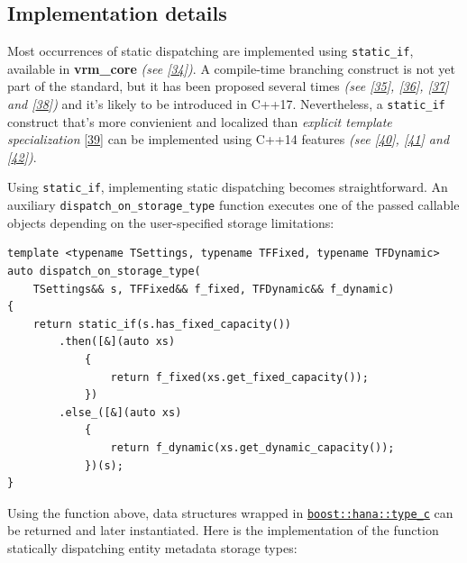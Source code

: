 \documentclass[oneside, 12pt, a4paper, openany]{book}
\begin{document}
\subsection{Implementation details}\label{implementation-details-5}

Most occurrences of static dispatching are implemented using
\texttt{static_if},
available in \textbf{vrm\_core} \emph{(see
{[}\protect\hyperlink{ref-github_vrmcore}{34}{]})}. A compile-time
branching construct is not yet part of the standard, but it has been
proposed several times \emph{(see
{[}\protect\hyperlink{ref-isocpp_sif0}{35}{]},
{[}\protect\hyperlink{ref-isocpp_sif1}{36}{]},
{[}\protect\hyperlink{ref-isocpp_sif2}{37}{]} and
{[}\protect\hyperlink{ref-isocpp_sif3}{38}{]})} and it's likely to be
introduced in C++17. Nevertheless, a
\texttt{static_if}
construct that's more convienient and localized than \emph{explicit
template specialization}
{[}\protect\hyperlink{ref-cppreference_ets}{39}{]} can be implemented
using C++14 features \emph{(see {[}\protect\hyperlink{ref-sif0}{40}{]},
{[}\protect\hyperlink{ref-sif1}{41}{]} and
{[}\protect\hyperlink{ref-sif2}{42}{]})}.

Using
\texttt{static_if},
implementing static dispatching becomes straightforward. An auxiliary
\texttt{dispatch_on_storage_type}
function executes one of the passed callable objects depending on the
user-specified storage limitations:

\begin{verbatim}
template <typename TSettings, typename TFFixed, typename TFDynamic>
auto dispatch_on_storage_type(
    TSettings&& s, TFFixed&& f_fixed, TFDynamic&& f_dynamic)
{
    return static_if(s.has_fixed_capacity())
        .then([&](auto xs)
            {
                return f_fixed(xs.get_fixed_capacity());
            })
        .else_([&](auto xs)
            {
                return f_dynamic(xs.get_dynamic_capacity());
            })(s);
}
\end{verbatim}

Using the function above, data structures wrapped in
\href{http://www.boost.org/doc/libs/1_61_0/libs/hana/doc/html/structboost_1_1hana_1_1type.html\#ae35139e732c4b75e91061513cf445628}{\texttt{boost::hana::type_c}}
can be returned and later instantiated. Here is the implementation of
the function statically dispatching entity metadata storage types:
\end{document}

